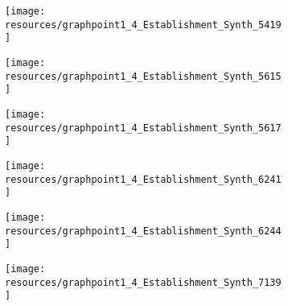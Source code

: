 \documentclass[12pt]{article}
\begin{document}
\begin{figure}[H]
	\centering
	\begin{subfigure}[b]{0.4\textwidth}
	    \texttt{[image: resources/graphpoint1\_4\_Establishment\_Synth\_5419]}
	\end{subfigure}
	\begin{subfigure}[b]{0.4\textwidth}
	    \texttt{[image: resources/graphpoint1\_4\_Establishment\_Synth\_5615]}
	\end{subfigure}
\end{figure}
\begin{figure}[H]
	\centering
	\begin{subfigure}[b]{0.4\textwidth}
	    \texttt{[image: resources/graphpoint1\_4\_Establishment\_Synth\_5617]}
	\end{subfigure}
	\begin{subfigure}[b]{0.4\textwidth}
	    \texttt{[image: resources/graphpoint1\_4\_Establishment\_Synth\_6241]}
	\end{subfigure}
\end{figure}

\begin{figure}[H]
	\centering
	\begin{subfigure}[b]{0.4\textwidth}
	    \texttt{[image: resources/graphpoint1\_4\_Establishment\_Synth\_6244]}
	\end{subfigure}
	\begin{subfigure}[b]{0.4\textwidth}
	    \texttt{[image: resources/graphpoint1\_4\_Establishment\_Synth\_7139]}
	\end{subfigure}
\end{figure}
\end{document}
